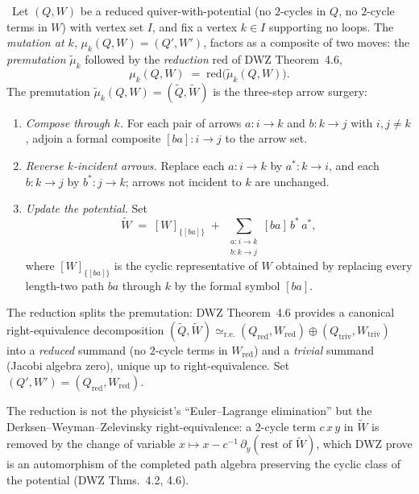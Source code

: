\begin{definition}
\label{def:mutation-qp}
\ClaimStatusDefinition\ Let $(Q, W)$ be a reduced quiver-with-potential
(no $2$-cycles in $Q$, no $2$-cycle terms in $W$) with vertex set $I$, and
fix a vertex $k \in I$ supporting no loops. The \emph{mutation at $k$},
$\mu_k(Q, W) = (Q', W')$, factors as a composite of two moves:
the \emph{premutation} $\tilde\mu_k$ followed by the \emph{reduction}
$\mathrm{red}$ of DWZ Theorem~4.6,
\[
  \mu_k(Q, W) \;=\; \mathrm{red}\bigl(\tilde\mu_k(Q, W)\bigr).
\]
The premutation $\tilde\mu_k(Q, W) = (\tilde Q, \tilde W)$ is the three-step
arrow surgery:
\begin{enumerate}
\item[(M1)] \emph{Compose through $k$.} For each pair of arrows
$a \colon i \to k$ and $b \colon k \to j$ with $i, j \neq k$, adjoin a
formal composite $[ba] \colon i \to j$ to the arrow set.
\item[(M2)] \emph{Reverse $k$-incident arrows.} Replace each
$a \colon i \to k$ by $a^{*} \colon k \to i$, and each $b \colon k \to j$
by $b^{*} \colon j \to k$; arrows not incident to $k$ are unchanged.
\item[(M3)] \emph{Update the potential.} Set
\[
  \tilde W \;=\; [W]_{\{[ba]\}} \;+\; \sum_{\substack{a \colon i \to k \\ b \colon k \to j}}
  [ba]\, b^{*}\, a^{*},
\]
where $[W]_{\{[ba]\}}$ is the cyclic representative of $W$ obtained by
replacing every length-two path $ba$ through $k$ by the formal symbol $[ba]$.
\end{enumerate}
The reduction splits the premutation: DWZ Theorem~4.6 provides a canonical
right-equivalence decomposition
$(\tilde Q, \tilde W) \simeq_{\mathrm{r.e.}} (Q_{\mathrm{red}},
W_{\mathrm{red}}) \oplus (Q_{\mathrm{triv}}, W_{\mathrm{triv}})$
into a \emph{reduced} summand (no $2$-cycle terms in $W_{\mathrm{red}}$) and
a \emph{trivial} summand (Jacobi algebra zero), unique up to right-equivalence.
Set $(Q', W') = (Q_{\mathrm{red}}, W_{\mathrm{red}})$.
\end{definition}

The reduction is not the physicist's ``Euler--Lagrange elimination'' but the
Derksen--Weyman--Zelevinsky right-equivalence: a $2$-cycle term
$c\, x\, y$ in $\tilde W$ is removed by the change of variable
$x \mapsto x - c^{-1}\,\partial_{y}(\text{rest of }\tilde W)$, which DWZ
prove is an automorphism of the completed path algebra preserving the cyclic
class of the potential (DWZ Thms.~4.2, 4.6).

